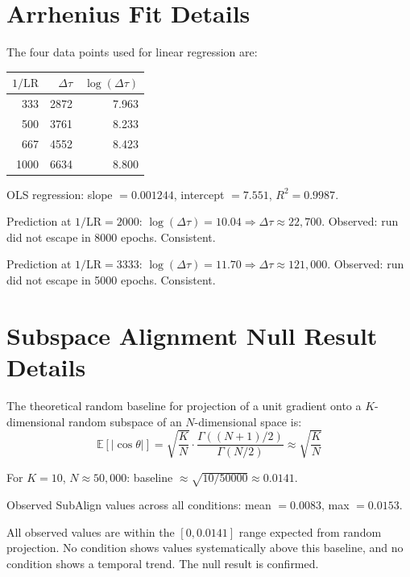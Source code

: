 \documentclass[11pt,twocolumn]{article}
\begin{document}
\appendix

\section{Arrhenius Fit Details}
\label{app:fit}

The four data points used for linear regression are:

\begin{center}
\small
\begin{tabular}{@{}rrr@{}}
\toprule
$1/\mathrm{LR}$ & $\Delta\tau$ & $\log(\Delta\tau)$ \\
\midrule
333  & 2872 & 7.963 \\
500  & 3761 & 8.233 \\
667  & 4552 & 8.423 \\
1000 & 6634 & 8.800 \\
\bottomrule
\end{tabular}
\end{center}

OLS regression: slope $= 0.001244$, intercept $= 7.551$, $R^2 = 0.9987$.

Prediction at $1/\mathrm{LR} = 2000$: $\log(\Delta\tau) = 10.04 \Rightarrow \Delta\tau \approx 22{,}700$. Observed: run did not escape in 8000 epochs. Consistent.

Prediction at $1/\mathrm{LR} = 3333$: $\log(\Delta\tau) = 11.70 \Rightarrow \Delta\tau \approx 121{,}000$. Observed: run did not escape in 5000 epochs. Consistent.

\section{Subspace Alignment Null Result Details}
\label{app:null}

The theoretical random baseline for projection of a unit gradient onto a $K$-dimensional random subspace of an $N$-dimensional space is:
$$\mathbb{E}[|\cos\theta|] = \sqrt{\frac{K}{N}} \cdot \frac{\Gamma((N+1)/2)}{\Gamma(N/2)} \approx \sqrt{\frac{K}{N}}$$

For $K=10$, $N \approx 50{,}000$: baseline $\approx \sqrt{10/50000} \approx 0.0141$.

Observed SubAlign values across all conditions: mean $= 0.0083$, max $= 0.0153$.

All observed values are within the $[0, 0.0141]$ range expected from random projection. No condition shows values systematically above this baseline, and no condition shows a temporal trend. The null result is confirmed.
\end{document}
